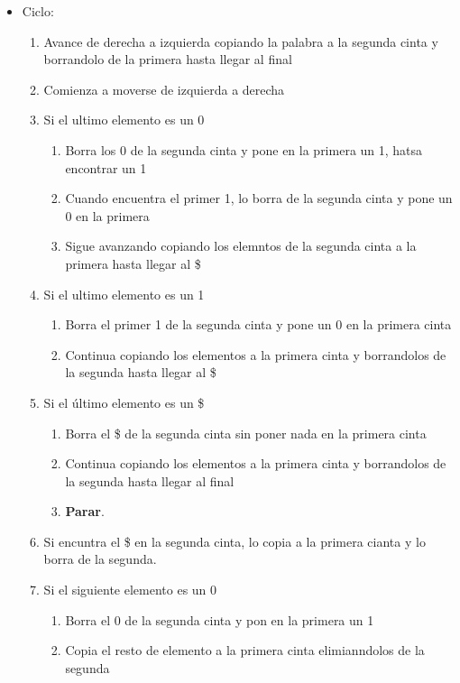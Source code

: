 \begin{itemize}
    \item Ciclo:
    \begin{enumerate}
        \item Avance de derecha a izquierda copiando la palabra a la segunda cinta y borrandolo de la primera hasta llegar al final
        \item Comienza a moverse de izquierda a derecha
        \item Si el ultimo elemento es un 0
        \begin{enumerate}
            \item Borra los 0 de la segunda cinta y pone en la primera un 1, hatsa encontrar un 1
            \item Cuando encuentra el primer 1, lo borra de la segunda cinta y pone un 0 en la primera
            \item Sigue avanzando copiando los elemntos de la segunda cinta a la primera hasta llegar al \$
        \end{enumerate}
        \item Si el ultimo elemento es un 1   
        \begin{enumerate}
            \item Borra el primer 1 de la segunda cinta y pone un 0 en la primera cinta
            \item Continua copiando los elementos a la primera cinta y borrandolos de la segunda hasta llegar al \$
        \end{enumerate} 
        \item Si el último elemento es un \$
        \begin{enumerate}
            \item Borra el \$ de la segunda cinta sin poner nada en la primera cinta
            \item Continua copiando los elementos a la primera cinta y borrandolos de la segunda hasta llegar al final
            \item \textbf{Parar}.
        \end{enumerate} 
        \item Si encuntra el \$ en la segunda cinta, lo copia a la primera cianta y lo borra de la segunda.
        \item Si el siguiente elemento es un 0
        \begin{enumerate}
            \item Borra el 0 de la segunda cinta y pon en la primera un 1
            \item Copia el resto de elemento a la primera cinta elimianndolos de la segunda

\end{enumerate}
\end{enumerate}
\end{itemize}
